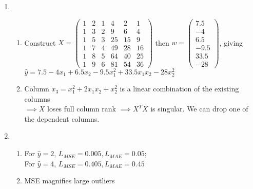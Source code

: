 \documentclass[12pt, a4paper]{article}
\begin{document}
\begin{enumerate}[\Alph*.]
  \item 
    \begin{enumerate}[\arabic*.]
      \item Construct $X = \left(\begin{array}{cccccc} 1 & 2 & 1 & 4 & 2 & 1\\ 1 & 3 & 2 & 9 & 6 & 4\\ 1 & 5 & 3 & 25 & 15 & 9\\ 1 & 7 & 4 & 49 & 28 & 16\\ 1 & 8 & 5 & 64 & 40 & 25\\ 1 & 9 & 6 & 81 & 54 & 36 \end{array}\right)$ then $w = \left(\begin{array}{c} 7.5\\ -4\\ 6.5\\ -9.5\\ 33.5\\ -28 \end{array}\right)$, giving $\hat{y} = 7.5 - 4x_1 + 6.5x_2 - 9.5x_1^2 + 33.5x_1x_2 - 28x_2^2$

      \item Column $x_3 = x_1^2+2x_1x_2+x_2^2$ is a linear combination of the existing columns\\$\implies X$ loses full column rank $\implies X^TX$ is singular. We can drop one of the dependent columns.
    \end{enumerate}

  \item 
    \begin{enumerate}[\arabic*.]
      \item For $\hat{y} = 2$, $L_{MSE} = 0.005, L_{MAE} = 0.05$;\\For $\hat{y} = 4$, $L_{MSE} = 0.405, L_{MAE} = 0.45$

      \item MSE magnifies large outliers
    \end{enumerate}


\end{enumerate}
\end{document}
